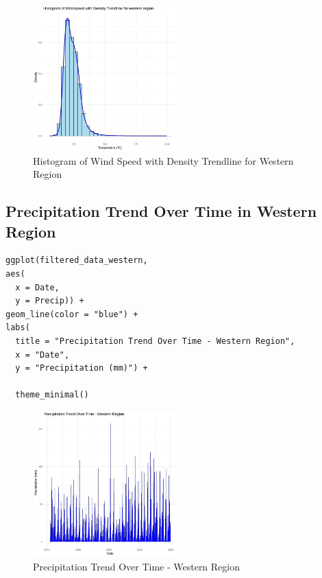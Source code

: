 \begin{figure}[h]
    \centering
    \includegraphics[width=0.5\textwidth]{figures/hist_west.jpg}
    \caption{Histogram of Wind Speed with Density Trendline for Western Region}
\end{figure}

\subsection*{Precipitation Trend Over Time in Western Region}

\begin{verbatim}
ggplot(filtered_data_western, 
aes(
  x = Date, 
  y = Precip)) +
geom_line(color = "blue") +
labs(
  title = "Precipitation Trend Over Time - Western Region",
  x = "Date", 
  y = "Precipitation (mm)") +

  theme_minimal()
\end{verbatim}

\begin{figure}[h]
    \centering
    \includegraphics[width=0.5\textwidth]{figures/precip_west.jpg}
    \caption{Precipitation Trend Over Time - Western Region}
\end{figure}

